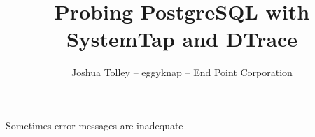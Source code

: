 \documentclass{beamer}
\begin{document}
\title{Probing PostgreSQL with SystemTap and DTrace}
\author{Joshua Tolley -- eggyknap -- End Point Corporation
}


\frame{\titlepage}


\begin{frame}
    Sometimes error messages are inadequate

    \begin{figure}[b]
    \begin{centering}
    \end{centering}
    \end{figure}
\end{frame}
\end{document}

